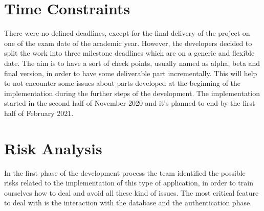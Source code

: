 	\section{Time Constraints}
		There were no defined deadlines, except for the final delivery of the project on one of the exam date of the academic year.
		However, the developers decided to split the work into three milestone deadlines which are on a generic and flexible date. 
		The aim is to have a sort of check points, usually named as alpha, beta and final version, in order to have some deliverable part incrementally.
		This will help to not encounter some issues about parts developed at the beginning of the implementation during the further steps of the development.
		The implementation started in the second half of November 2020 and it's planned to end by the first half of February 2021.


	\section{Risk Analysis}
		In the first phase of the development process the team identified the possible risks related to the implementation of this type of application, in order to train ourselves how to deal and avoid all these kind of issues.
		The most critical feature to deal with is the interaction with the database and the authentication phase.


